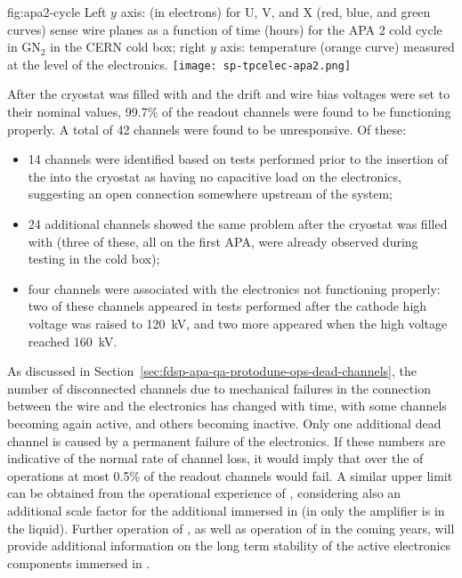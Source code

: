 \begin{dunefigure}
{fig:apa2-cycle}
{Left $y$ axis:  (in electrons) for U, V, and X (red, blue, and green 
curves) sense wire planes as a function of time (hours) for the APA 2 cold 
cycle in GN$_2$ in the CERN cold box; right $y$ axis: temperature 
(orange curve) measured at the level of the  electronics.}
\texttt{[image: sp-tpcelec-apa2.png]}
\end{dunefigure}
After the cryostat was filled with  and the drift and wire 
bias voltages were set to their nominal values,
99.7\% of the  readout channels were found to be functioning properly.
A total of 42 channels were found to be unresponsive. Of these:
\begin{itemize}
\item{14 channels were identified based on tests performed prior
to the insertion of the  into the cryostat as having
no capacitive load on the  electronics, suggesting an open 
connection somewhere upstream  of the  system;}
\item{24 additional channels showed the same problem after the
cryostat was filled with  (three of these, all on the
first APA, were already observed during testing in the cold box);}
\item{four channels were associated with the  electronics
not functioning properly: two of these
channels appeared in tests performed after the cathode high
voltage was raised to \SI{120}{kV}, and two more
appeared when the high voltage reached \SI{160}{kV}.}
\end{itemize}

As discussed in Section~\ref{sec:fdsp-apa-qa-protodune-ops-dead-channels},
the number of disconnected channels %
due to mechanical failures in the connection between
the  wire and the  electronics has
changed with time, with some channels becoming again active,
and others becoming inactive. Only one additional dead channel
is caused by a permanent failure of the  electronics.
If these numbers are indicative
of the normal rate of channel loss, it would imply that
over the \dunelifetime of  operations at
most \num{0.5}\% of the readout channels would fail. A
similar upper limit can be obtained from the operational
experience of , considering also an
additional scale factor for the additional 
immersed in  (in  only
the  amplifier is in the liquid). Further 
operation of , as well as operation of
 in the coming years, will provide additional
information on the long term stability of the active electronics
components immersed in .

